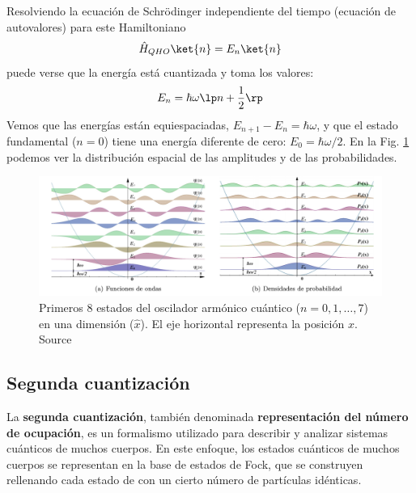         Resolviendo la ecuación de Schrödinger independiente del tiempo (ecuación de autovalores) para este Hamiltoniano
        \begin{equation} \label{ec_sqc_canonica_QHO_schrodinger}
            \hat{H}_{QHO} \ket{n} = E_n \ket{n}
        \end{equation}
        puede verse que la energía está cuantizada y toma los valores:
        \begin{equation} \label{ec_sqc_canonica_QHO_E}
            E_n = \hbar \omega \lp n + \frac{1}{2} \rp            
        \end{equation}
        Vemos que las energías están equiespaciadas, $E_{n+1} - E_n = \hbar \omega$, y que el estado fundamental ($n=0$) tiene una energía diferente de cero: $E_0 = \hbar \omega/2$. En la Fig. \ref{Fig_sqc_Oscilador_Armonico_amplitudes_y_prob} podemos ver la distribución espacial de las amplitudes y de las probabilidades. 
        
        \begin{figure}[t]
            \centering 
            \includegraphics[width=1\linewidth]{Figuras/Fig_Hardware_Oscilador_Armonico.png}
            \caption{Primeros $8$ estados del oscilador armónico cuántico ($n=0,1, \dots,7$) en una dimensión ($\hat{x}$). El eje horizontal representa la posición $x$. Source \cite{bib_Hardware_Wiki_QHO}}
            \label{Fig_sqc_Oscilador_Armonico_amplitudes_y_prob}
        \end{figure}





        
    \subsection{Segunda cuantización}

    La \textbf{segunda cuantización}, también denominada \textbf{representación del número de ocupación}, es un formalismo utilizado para describir y analizar sistemas cuánticos de muchos cuerpos. En este enfoque, los estados cuánticos de muchos cuerpos se representan en la base de estados de Fock, que se construyen rellenando cada estado de con un cierto número de partículas idénticas. 



